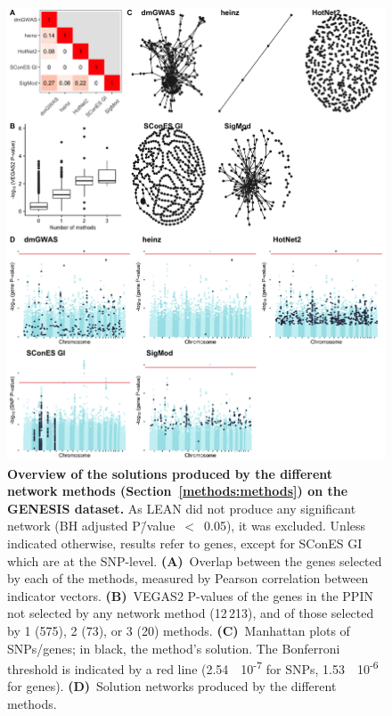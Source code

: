 \documentclass[10pt,letterpaper]{article}
\begin{document}
\begin{figure}[!ht]
  \centering
  \includegraphics[width=\textwidth]{./figures/figure_1.png}
  \caption{{\bf Overview of the solutions produced by the different network methods (Section~\ref{methods:methods}) on the GENESIS dataset. } As LEAN did not produce any significant network (BH adjusted P\=/value~$<$~0.05), it was excluded. Unless indicated otherwise, results refer to genes, except for SConES GI which are at the SNP-level. \textbf{(A)}~Overlap between the genes selected by each of the methods, measured by Pearson correlation between indicator vectors. \textbf{(B)}~VEGAS2 P-values of the genes in the PPIN not selected by any network method (12\,213), and of those selected by 1 (575), 2 (73), or 3 (20) methods. \textbf{(C)}~Manhattan plots of SNPs/genes; in black, the method's solution. The Bonferroni threshold is indicated by a red line (2.54~\texttimes{}~10\textsuperscript{-7} for SNPs, 1.53~\texttimes{}~10\textsuperscript{-6} for genes). \textbf{(D)}~Solution networks produced by the different methods.}
  \label{fig:solution_overview}
\end{figure}
\end{document}
